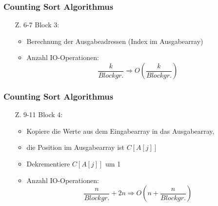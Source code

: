 \documentclass{beamer}
\begin{document}
\begin{frame}
  \frametitle{Counting Sort Algorithmus}
  \begin{itemize}
    \item[Z. 6-7] Block 3:
    \begin{itemize}
      \item Berechnung der Ausgabeadressen (Index im Ausgabearray)
      \item Anzahl IO-Operationen:
            \[
              \frac{k}{Blockgr.} \Rightarrow O(\frac{k}{Blockgr.})
            \]
    \end{itemize}
  \end{itemize}
  \vspace{1cm}
  \begin{figure}
    \flushright
  \end{figure}
\end{frame}

\begin{frame}
  \frametitle{Counting Sort Algorithmus}
  \begin{itemize}
    \item[Z. 9-11] Block 4:
    \begin{itemize}
      \item Kopiere die Werte aus dem Eingabearray in das Ausgabearray,
      \item die Position im Ausgabearray ist $C[A[j]]$
      \item Dekrementiere $C[A[j]]$ um 1
      \item Anzahl IO-Operationen:
            \[
              \frac{n}{Blockgr.} + 2n \Rightarrow O(n + \frac{n}{Blockgr.})
            \]
    \end{itemize}
  \end{itemize}

  \begin{figure}
    \flushright
  \end{figure}
\end{frame}
\end{document}
